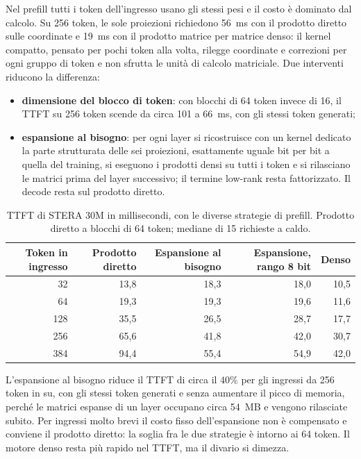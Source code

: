 Nel prefill tutti i token dell'ingresso usano gli stessi pesi e il costo è dominato dal calcolo. Su 256 token, le sole proiezioni richiedono 56~ms con il prodotto diretto sulle coordinate e 19~ms con il prodotto matrice per matrice denso: il kernel compatto, pensato per pochi token alla volta, rilegge coordinate e correzioni per ogni gruppo di token e non sfrutta le unità di calcolo matriciale. Due interventi riducono la differenza:
\begin{itemize}
\item \textbf{dimensione del blocco di token}: con blocchi di 64 token invece di 16, il TTFT su 256 token scende da circa 101 a 66~ms, con gli stessi token generati;
\item \textbf{espansione al bisogno}: per ogni layer si ricostruisce con un kernel dedicato la parte strutturata delle sei proiezioni, esattamente uguale bit per bit a quella del training, si eseguono i prodotti densi su tutti i token e si rilasciano le matrici prima del layer successivo; il termine low-rank resta fattorizzato. Il decode resta sul prodotto diretto.
\end{itemize}

\begin{table}[htbp]
\centering
\small
\begin{tabular}{rrrrr}
\toprule
Token in ingresso & Prodotto diretto & Espansione al bisogno & Espansione, rango 8 bit & Denso \\
\midrule
32 & 13,8 & 18,3 & 18,0 & 10,5 \\
64 & 19,3 & 19,3 & 19,6 & 11,6 \\
128 & 35,5 & 26,5 & 28,7 & 17,7 \\
256 & 65,6 & 41,8 & 42,0 & 30,7 \\
384 & 94,4 & 55,4 & 54,9 & 42,0 \\
\bottomrule
\end{tabular}
\caption{TTFT di STERA 30M in millisecondi, con le diverse strategie di prefill. Prodotto diretto a blocchi di 64 token; mediane di 15 richieste a caldo.}
\label{tab:prefill-strategie}
\end{table}

L'espansione al bisogno riduce il TTFT di circa il $40\%$ per gli ingressi da 256 token in su, con gli stessi token generati e senza aumentare il picco di memoria, perché le matrici espanse di un layer occupano circa 54~MB e vengono rilasciate subito. Per ingressi molto brevi il costo fisso dell'espansione non è compensato e conviene il prodotto diretto: la soglia fra le due strategie è intorno ai 64 token. Il motore denso resta più rapido nel TTFT, ma il divario si dimezza.

